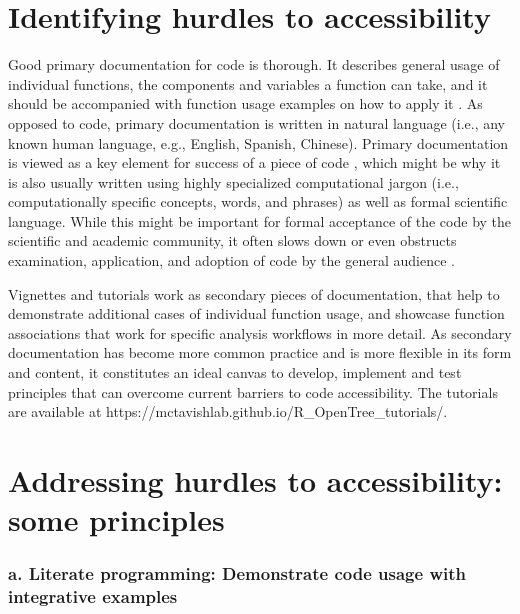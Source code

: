 \documentclass[12pt]{article}
\begin{document}
\section*{Identifying hurdles to accessibility}
\label{sec:identifying}

Good primary documentation for code is thorough. It describes general usage of individual functions,
the components and variables a function can take, and it should be accompanied with
function usage examples on how to apply it \citep{karimzadeh2018top}.
As opposed to code, primary documentation is written in natural language (i.e.,
any known human language, e.g., English, Spanish, Chinese).
Primary documentation is viewed as a key element for success of a piece of code
\citep{karimzadeh2018top},
which might be why it is also usually written using highly specialized computational jargon (i.e., computationally specific concepts,
words, and phrases) as well as formal scientific language.
While this might be important for formal acceptance of the code by the scientific
and academic community, it often slows down or even
obstructs examination, application, and adoption of code by the general audience \citep{ball2017its}.

Vignettes and tutorials work as secondary pieces of documentation, that help to demonstrate
additional cases of individual function usage, and showcase function associations
that work for specific analysis workflows in more detail.
As secondary documentation has become more common practice and is more flexible
in its form and content, it constitutes an ideal canvas to develop, implement and
test principles that can overcome current barriers to code accessibility.
The tutorials are available at https://mctavishlab.github.io/R\_OpenTree\_tutorials/.

\section*{Addressing hurdles to accessibility: some principles}
\label{sec:addressing}

\subsubsection*{a. Literate programming: Demonstrate code usage with integrative examples}
\end{document}
